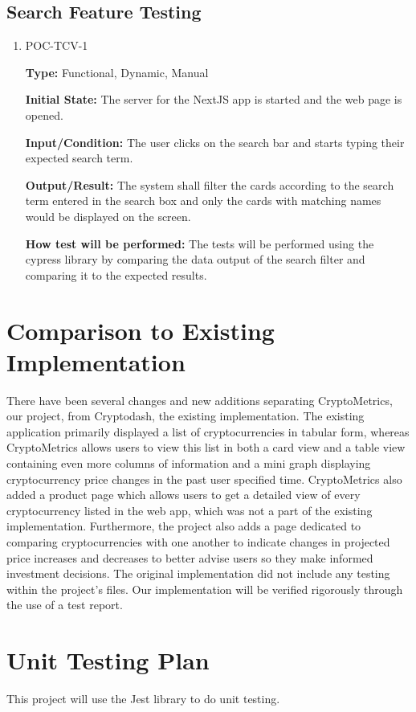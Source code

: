\documentclass[12pt, titlepage]{article}
\begin{document}
\subsection{Search Feature Testing}
\begin{enumerate}
\item{POC-TCV-1}


\textbf{Type:} Functional, Dynamic, Manual
					
\textbf{Initial State:} The server for the NextJS app is started and the web page is opened.
					
\textbf{Input/Condition:} The user clicks on the search bar and starts typing their expected search term.
					
\textbf{Output/Result:} The system shall filter the cards according to the search term entered in the search box and only the cards with matching names would be displayed on the screen.
					
\textbf{How test will be performed:} The tests will be performed using the cypress library by comparing the data output of the search filter and comparing it to the expected results. 
\end{enumerate}
	
\section{Comparison to Existing Implementation}	

There have been several changes and new additions separating CryptoMetrics, our project, from Cryptodash, the existing implementation. The existing application primarily displayed a list of cryptocurrencies in tabular form, whereas CryptoMetrics allows users to view this list in both a card view and a table view containing even more columns of information and a mini graph displaying cryptocurrency price changes in the past user specified time. CryptoMetrics also added a product page which allows users to get a detailed view of every cryptocurrency listed in the web app, which was not a part of the existing implementation. Furthermore, the project also adds a page dedicated to comparing cryptocurrencies with one another to indicate changes in projected price increases and decreases to better advise users so they make informed investment decisions. The original implementation did not include any testing within the project's files. Our implementation will be verified rigorously through the use of a test report.
\newpage
\section{Unit Testing Plan}
This project will use the Jest library to do unit testing.	
\end{document}

